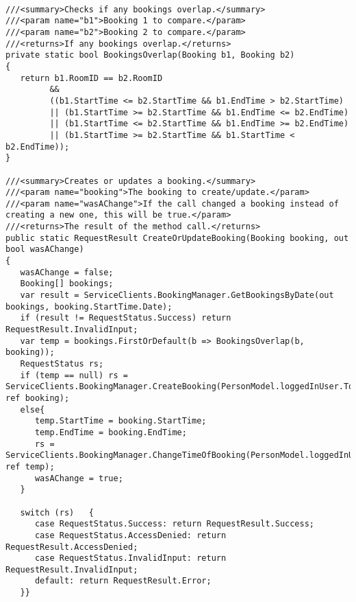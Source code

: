 \begin{lstlisting}[caption= Klient model kode til oprettelse af booking]

///<summary>Checks if any bookings overlap.</summary>
///<param name="b1">Booking 1 to compare.</param>
///<param name="b2">Booking 2 to compare.</param>
///<returns>If any bookings overlap.</returns>
private static bool BookingsOverlap(Booking b1, Booking b2)
{
   return b1.RoomID == b2.RoomID
         &&
         ((b1.StartTime <= b2.StartTime && b1.EndTime > b2.StartTime)
         || (b1.StartTime >= b2.StartTime && b1.EndTime <= b2.EndTime)
         || (b1.StartTime <= b2.StartTime && b1.EndTime >= b2.EndTime)
         || (b1.StartTime >= b2.StartTime && b1.StartTime < b2.EndTime));
}

///<summary>Creates or updates a booking.</summary>
///<param name="booking">The booking to create/update.</param>
///<param name="wasAChange">If the call changed a booking instead of creating a new one, this will be true.</param>
///<returns>The result of the method call.</returns>
public static RequestResult CreateOrUpdateBooking(Booking booking, out bool wasAChange)
{
   wasAChange = false;
   Booking[] bookings;
   var result = ServiceClients.BookingManager.GetBookingsByDate(out bookings, booking.StartTime.Date);
   if (result != RequestStatus.Success) return RequestResult.InvalidInput;
   var temp = bookings.FirstOrDefault(b => BookingsOverlap(b, booking));
   RequestStatus rs;
   if (temp == null) rs = ServiceClients.BookingManager.CreateBooking(PersonModel.loggedInUser.Token, ref booking);
   else{
      temp.StartTime = booking.StartTime;
      temp.EndTime = booking.EndTime;
      rs = ServiceClients.BookingManager.ChangeTimeOfBooking(PersonModel.loggedInUser.Token, ref temp);
      wasAChange = true;
   }

   switch (rs)   {
      case RequestStatus.Success: return RequestResult.Success;
      case RequestStatus.AccessDenied: return RequestResult.AccessDenied;
      case RequestStatus.InvalidInput: return RequestResult.InvalidInput;
      default: return RequestResult.Error;
   }}
\end{lstlisting}